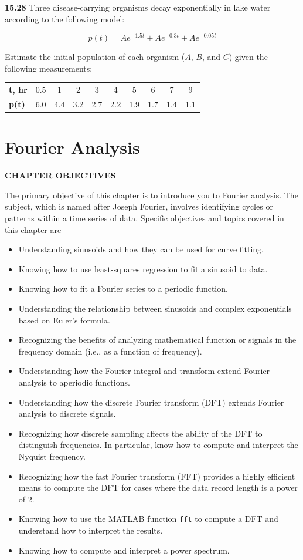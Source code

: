 \documentclass[../main.tex]{subfiles}
\begin{document}
\begin{multicols}{2}
	\noindent\textbf{15.28} Three disease-carrying organisms decay exponentially in lake water according to the following model:

	$$
		p(t) = Ae^{-1.5t} + Ae^{-0.3t} + Ae^{-0.05t}
	$$

	\noindent  Estimate the initial population of each organism ($A$, $B$,
	and $C$) given the following measurements:

	\noindent
	\begin{tabular}{l c c c c c c c c c}
		\textbf{t, hr} & 0.5 & 1 & 2 & 3 & 4 & 5 & 6 & 7 & 9 \\
		\textbf{p(t)} & 6.0 & 4.4 & 3.2 & 2.7 & 2.2 & 1.9 & 1.7 & 1.4 & 1.1
	\end{tabular}
\end{multicols}


\label{cha:cha_P_16} %
\chapter{Fourier Analysis}
\textbf{CHAPTER OBJECTIVES}

\noindent The primary objective of this chapter is to introduce you to Fourier analysis. The
subject, which is named after Joseph Fourier, involves identifying cycles or patterns
within a time series of data. Specific objectives and topics covered in this chapter are

\begin{itemize}
	\item Understanding sinusoids and how they can be used for curve fitting.
	\item Knowing how to use least-squares regression to fit a sinusoid to data.
	\item Knowing how to fit a Fourier series to a periodic function.
	\item Understanding the relationship between sinusoids and complex exponentials
	based on Euler's formula.
	\item Recognizing the benefits of analyzing mathematical function or signals in the frequency domain (i.e., as a function of frequency).
	\item Understanding how the Fourier integral and transform extend Fourier analysis to aperiodic functions.
	\item Understanding how the discrete Fourier transform (DFT) extends Fourier analysis
	to discrete signals.
	\item Recognizing how discrete sampling affects the ability of the DFT to distinguish
	frequencies. In particular, know how to compute and interpret the Nyquist
	frequency.
	\item Recognizing how the fast Fourier transform (FFT) provides a highly efficient
	means to compute the DFT for cases where the data record length is a power of 2.
	\item Knowing how to use the MATLAB function \texttt{fft} to compute a DFT and
	understand how to interpret the results.
	\item Knowing how to compute and interpret a power spectrum.
\end{itemize}
\end{document}
